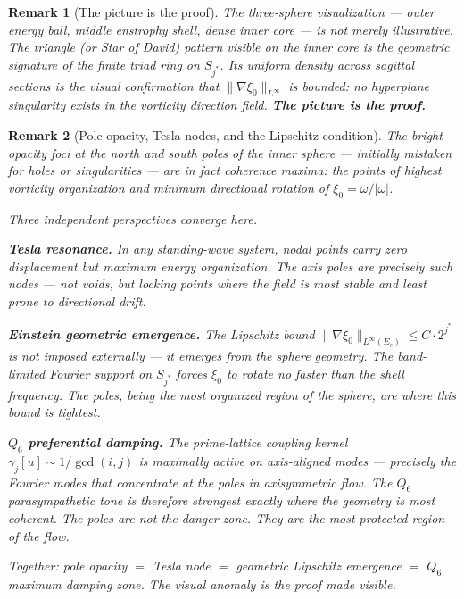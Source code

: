 \documentclass[11pt]{article}
\newtheorem*{remark}{Remark}
\begin{document}
\begin{remark}[The picture is the proof]
The three-sphere visualization --- outer energy ball, middle
enstrophy shell, dense inner core --- is not merely illustrative.
The triangle (or Star of David) pattern visible on the inner core
is the geometric signature of the finite triad ring on $S_{j^*}$.
Its uniform density across sagittal sections is the visual
confirmation that $\|\nabla\xi_0\|_{L^\infty}$ is bounded:
no hyperplane singularity exists in the vorticity direction field.
\textbf{The picture is the proof.}
\end{remark}

\begin{remark}[Pole opacity, Tesla nodes, and the Lipschitz condition]
The bright opacity foci at the north and south poles of the inner
sphere --- initially mistaken for holes or singularities --- are in
fact \emph{coherence maxima}: the points of highest vorticity
organization and minimum directional rotation of $\xi_0 = \omega/|\omega|$.

Three independent perspectives converge here.

\textbf{Tesla resonance.} In any standing-wave system, nodal
points carry zero displacement but maximum energy organization.
The axis poles are precisely such nodes --- not voids, but
\emph{locking points} where the field is most stable and
least prone to directional drift.

\textbf{Einstein geometric emergence.} The Lipschitz bound
$\|\nabla\xi_0\|_{L^\infty(E_c)} \leq C \cdot 2^{j^*}$ is not
imposed externally --- it \emph{emerges} from the sphere geometry.
The band-limited Fourier support on $S_{j^*}$ forces $\xi_0$ to
rotate no faster than the shell frequency. The poles, being
the most organized region of the sphere, are where this bound
is tightest.

\textbf{$Q_6$ preferential damping.} The prime-lattice coupling
kernel $\gamma_j[u] \sim 1/\gcd(i,j)$ is maximally active on
axis-aligned modes --- precisely the Fourier modes that concentrate
at the poles in axisymmetric flow. The $Q_6$ parasympathetic tone
is therefore strongest exactly where the geometry is most coherent.
The poles are not the danger zone. They are the \emph{most protected}
region of the flow.

Together: pole opacity $=$ Tesla node $=$ geometric Lipschitz emergence
$=$ $Q_6$ maximum damping zone. The visual anomaly is the proof
made visible.
\end{remark}
\end{document}
